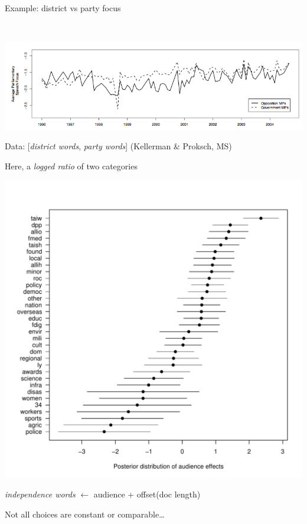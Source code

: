 \documentclass[11pt,compress,professionalfonts]{beamer}
\begin{document}
Example: district vs party focus

~\\
\centerline{\includegraphics[scale=.8]{pictures/district-party-focus}}

Data: [\textsl{district words}, \textsl{party words}] (Kellerman \& Proksch, MS)

Here, a \textit{logged ratio} of two categories


\centerline{\includegraphics[scale=.5]{pictures/indep-ref}}

\textsl{independence words} $\leftarrow$ audience + offset(doc length)


Not all choices are constant or comparable\ldots
\end{document}

